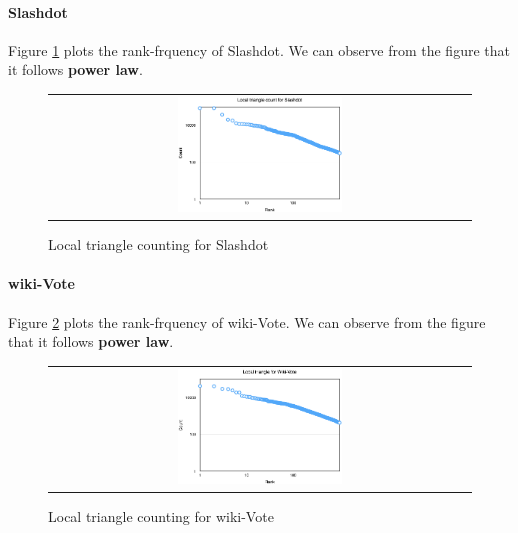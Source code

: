 \paragraph{Slashdot}
Figure \ref{t7:slashdot} plots the rank-frquency of Slashdot. We can observe from the figure that it follows {\bf power law}. 
\begin{figure}[!htbf]
\begin{center}
\begin{tabular}{c}
     \includegraphics[width=0.4\textwidth]{FIG/t7_slashdot.png}
\end{tabular}
\caption{Local triangle counting for Slashdot}
\label{t7:slashdot}
\end{center}
\end{figure}

\paragraph{wiki-Vote}
Figure \ref{t7:wikivote} plots the rank-frquency of wiki-Vote. We can observe from the figure that it follows {\bf power law}. 
\begin{figure}[!htbf]
\begin{center}
\begin{tabular}{c}
     \includegraphics[width=0.4\textwidth]{FIG/t7_wikivote.png}
\end{tabular}
\caption{Local triangle counting for wiki-Vote}
\label{t7:wikivote}
\end{center}
\end{figure}

